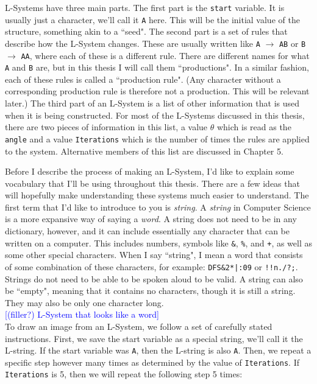 \documentclass[12pt,twoside]{reedthesis}
\newcommand{\code}[1]{\texttt{#1}}
\begin{document}
	L-Systems have three main parts. The first part is the \code{start} variable. It is usually just a character, we'll call it \code{A} here. This will be the initial value of the structure, something akin to a ``seed". The second part is a set of rules that describe how the L-System changes. These are usually written like \code{A} $\rightarrow$ \code{AB} or \code{B} $\rightarrow$ \code{AA}, where each of these is a different rule. There are different names for what \code{A} and \code{B} are, but in this thesis I will call them ``productions". In a similar fashion, each of these rules is called a ``production rule". (Any character without a corresponding production rule is therefore not a production. This will be relevant later.) The third part of an L-System is a list of other information that is used when it is being constructed. For most of the L-Systems discussed in this thesis, there are two pieces of information in this list, a value $\theta$ which is read as the \code{angle} and a value \code{Iterations} which is the number of times the rules are applied to the system. Alternative members of this list are discussed in Chapter 5.

	Before I describe the process of making an L-System, I'd like to explain some vocabulary that I'll be using throughout this thesis. There are a few ideas that will hopefully make understanding these systems much easier to understand. The first term that I'd like to introduce to you is \textit{string}. A \textit{string} in Computer Science is a more expansive way of saying a \textit{word}. A string does not need to be in any dictionary, however, and it can include essentially any character that can be written on a computer. This includes numbers, symbols like \code{\&}, \code{\%}, and \code{+}, as well as some other special characters. When I say ``string", I mean a word that consists of some combination of these characters, for example: \code{DFS\&2*|:09} or \code{!!n./?;}. Strings do not need to be able to be spoken aloud to be valid. A string can also be ``empty", meaning that it contains no characters, though it is still a string. They may also be only one character long. \\
	
	\textcolor{blue}{[(filler?) L-System that looks like a word]}\\
	
	To draw an image from an L-System, we follow a set of carefully stated instructions. First, we save the start variable as a special string, we'll call it the L-string. If the start variable was \code{A}, then the L-string is also \code{A}. Then, we repeat a specific step however many times as determined by the value of \code{Iterations}. If \code{Iterations} is 5, then we will repeat the following step 5 times:\\
	
\end{document}
